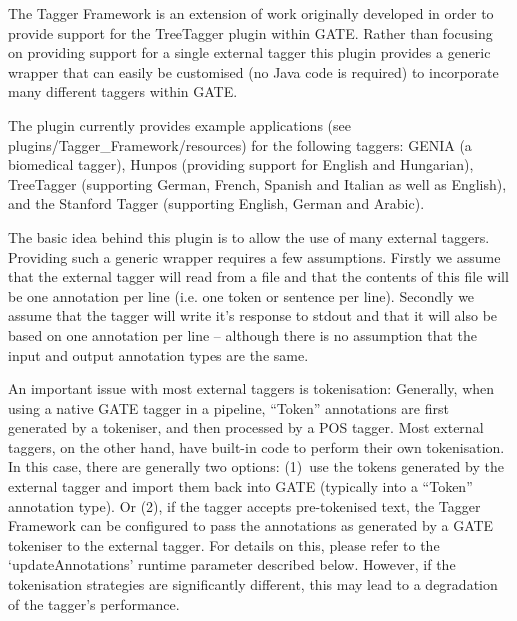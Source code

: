 The Tagger Framework is an extension of work originally developed in order to
provide support for the TreeTagger plugin within GATE. Rather than focusing on providing support for a single external tagger
this plugin provides a generic wrapper that can easily be customised (no Java code is required) to
incorporate many different taggers within GATE.

The plugin currently provides example applications (see plugins/Tagger\_Framework/resources) for the following
taggers: GENIA (a biomedical tagger), Hunpos (providing support for English and Hungarian), TreeTagger
(supporting German, French, Spanish and Italian as well as English), and the Stanford Tagger
(supporting English, German and Arabic).

The basic idea behind this plugin is to allow the use of many external taggers. Providing such a generic
wrapper requires a few assumptions. Firstly we assume that the external tagger will read from a file and
that the contents of this file will be one annotation per line (i.e. one token or sentence per line). Secondly
we assume that the tagger will write it's response to stdout and that it will also be based on one
annotation per line -- although there is no assumption that the input and output annotation types are the same.

An important issue with most external taggers is tokenisation:
Generally, when using a native GATE tagger in a pipeline, ``Token''
annotations are first generated by a tokeniser, and then processed by
a POS tagger. Most external taggers, on the other hand, have built-in
code to perform their own tokenisation. In this case, there are
generally two options: (1)~use the tokens generated by the external
tagger and import them back into GATE (typically into a ``Token''
annotation type). Or (2), if the tagger accepts pre-tokenised text,
the Tagger Framework can be configured to pass the annotations as
generated by a GATE tokeniser to the external tagger. For details on
this, please refer to the `updateAnnotations' runtime parameter
described below. However, if the tokenisation strategies are
significantly different, this may lead to a degradation of the
tagger's performance.


